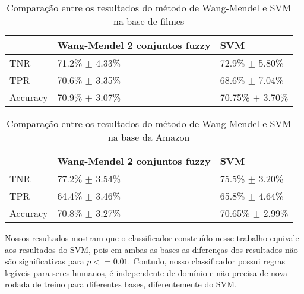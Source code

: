 \begin{table}[!h]
    \begin{tabular}{lll}
    ~         			& Wang-Mendel 2 conjuntos fuzzy						& SVM \\ \hline
    TNR 				& 71.2\% $\pm$ 4.33\%            								& 72.9\% $\pm$ 5.80\%    \\
    TPR    			& 70.6\% $\pm$ 3.35\%     									& 68.6\% $\pm$ 7.04\%   \\
    Accuracy  		& 70.9\% $\pm$ 3.07\%             							& 70.75\% $\pm$ 3.70\%    \\
    \end{tabular}
    \caption{Comparação entre os resultados do método de Wang-Mendel e SVM na base de filmes}
	\label{table:movies_svm}
\end{table}

%
%
%

\begin{table}[!h]
    \begin{tabular}{lll}
    ~         				& Wang-Mendel 2 conjuntos fuzzy 							& SVM \\ \hline
    TNR 			     	& 77.2\% $\pm$ 3.54\%            									& 75.5\% $\pm$ 3.20\%    \\
    TPR    			   	& 64.4\% $\pm$ 3.46\%   											& 65.8\% $\pm$ 4.64\%   \\
    Accuracy  		   & 70.8\% $\pm$ 3.27\%       										& 70.65\% $\pm$ 2.99\%    \\
    \end{tabular}
    \caption{Comparação entre os resultados do método de Wang-Mendel e SVM na base da Amazon}
	\label{table:amazon_svm}
\end{table}

%
%
%

Nossos resultados mostram que o classificador construído nesse trabalho equivale aos resultados do SVM, pois em ambas as bases as diferenças dos resultados não são significativas para $p <= 0.01$. Contudo, nosso classificador possui regras legíveis para seres humanos, é independente de domínio e não precisa de nova rodada de treino para diferentes bases, diferentemente do SVM.